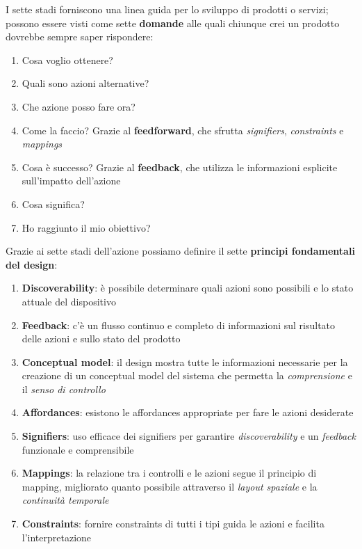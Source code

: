 I sette stadi forniscono una linea guida per lo sviluppo di prodotti o servizi; possono essere visti come sette \textbf{domande} alle quali chiunque crei un prodotto dovrebbe sempre saper rispondere:
\begin{enumerate}
	\item Cosa voglio ottenere?
	\item Quali sono azioni alternative?
	\item Che azione posso fare ora?
	\item Come la faccio? Grazie al \textbf{feedforward}, che sfrutta \textit{signifiers}, \textit{constraints} e \textit{mappings}
	\item Cosa è successo? Grazie al \textbf{feedback}, che utilizza le informazioni esplicite sull'impatto dell'azione
	\item Cosa significa?
	\item Ho raggiunto il mio obiettivo?
\end{enumerate}
\newpage
\noindent Grazie ai sette stadi dell'azione possiamo definire il sette \textbf{principi fondamentali del design}:
\begin{enumerate}
	\item \textbf{Discoverability}: è possibile determinare quali azioni sono possibili e lo stato attuale del dispositivo
	\item \textbf{Feedback}: c'è un flusso continuo e completo di informazioni sul risultato delle azioni e sullo stato del prodotto
	\item \textbf{Conceptual model}: il design mostra tutte le informazioni necessarie per la creazione di un conceptual model del sistema che permetta la \textit{comprensione} e il \textit{senso di controllo}
	\item \textbf{Affordances}: esistono le affordances appropriate per fare le azioni desiderate
	\item \textbf{Signifiers}: uso efficace dei signifiers per garantire \textit{discoverability} e un \textit{feedback} funzionale e comprensibile
	\item \textbf{Mappings}: la relazione tra i controlli e le azioni segue il principio di mapping, migliorato quanto possibile attraverso il \textit{layout spaziale} e la \textit{continuità temporale}
	\item \textbf{Constraints}: fornire constraints di tutti i tipi guida le azioni e facilita l'interpretazione
\end{enumerate}

